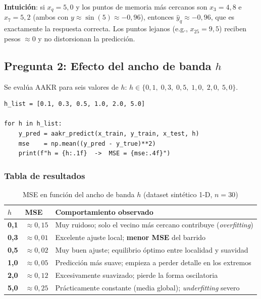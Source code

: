 \documentclass[12pt,a4paper]{article}
\newcommand{\caja}[1]{%
  \vspace{6pt}%
  \noindent\colorbox{cajaFondo}{\parbox{\dimexpr\linewidth-2\fboxsep}{%
    \color{azulTDS}\small #1}}%
  \vspace{6pt}%
}
\begin{document}
\caja{\textbf{Intuici\'on}: si $x_q = 5{,}0$ y los puntos de memoria m\'as cercanos
son $x_3 = 4{,}8$ e $x_7 = 5{,}2$ (ambos con $y \approx \sin(5) \approx -0{,}96$),
entonces $\hat{y}_q \approx -0{,}96$, que es exactamente la respuesta correcta.
Los puntos lejanos (e.g., $x_{25} = 9{,}5$) reciben pesos $\approx 0$ y no
distorsionan la predicci\'on.}

\subsection{Pregunta 2: Efecto del ancho de banda $h$}

Se eval\'ua AAKR para seis valores de $h$:
$h \in \{0{,}1,\;0{,}3,\;0{,}5,\;1{,}0,\;2{,}0,\;5{,}0\}$.

\begin{lstlisting}[caption={Barrido del par\'ametro $h$},
                   label={lst:sweep_h}]
h_list = [0.1, 0.3, 0.5, 1.0, 2.0, 5.0]

for h in h_list:
    y_pred = aakr_predict(x_train, y_train, x_test, h)
    mse    = np.mean((y_pred - y_true)**2)
    print(f"h = {h:.1f}  ->  MSE = {mse:.4f}")
\end{lstlisting}

\subsubsection{Tabla de resultados}

\begin{table}[H]
\centering
\caption{MSE en funci\'on del ancho de banda $h$ (dataset sint\'etico 1-D, $n=30$)}
\label{tab:mse_h}
\renewcommand{\arraystretch}{1.45}
\begin{tabular}{>{\centering\bfseries}p{1.5cm}
                >{\centering}p{2.6cm}
                >{\centering\arraybackslash}p{7.5cm}}
\toprule
\rowcolor{azulTDS!15}
$h$ & MSE & Comportamiento observado \\
\midrule
0,1 & $\approx 0{,}15$   & Muy ruidoso; solo el vecino m\'as cercano contribuye (\emph{overfitting}) \\
\rowcolor{grisClaro}
0,3 & $\approx 0{,}01$   & Excelente ajuste local; \textbf{menor MSE} del barrido \\
0,5 & $\approx 0{,}02$   & Muy buen ajuste; equilibrio \'optimo entre localidad y suavidad \\
\rowcolor{grisClaro}
1,0 & $\approx 0{,}05$   & Predicci\'on m\'as suave; empieza a perder detalle en los extremos \\
2,0 & $\approx 0{,}12$   & Excesivamente suavizado; pierde la forma oscilatoria \\
\rowcolor{grisClaro}
5,0 & $\approx 0{,}25$   & Pr\'acticamente constante (media global); \emph{underfitting} severo \\
\bottomrule
\end{tabular}
\end{table}
\end{document}
